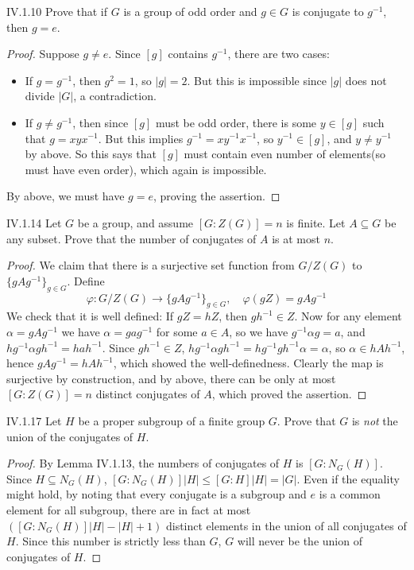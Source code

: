 \begin{problem}{IV.1.10}
Prove that if $G$ is a group of odd order and $g \in G$ is conjugate to $g^{-1}$, then $g = e$.
\end{problem}
\begin{proof}
Suppose $g \neq e$. Since $[g]$ contains $g^{-1}$, there are two cases:
\begin{itemize}
\item If $g = g^{-1}$, then $g^2 = 1$, so $|g| = 2$. But this is impossible since $|g|$ does not divide $|G|$, a contradiction.
\item If $g \neq g^{-1}$, then since $[g]$ must be odd order, there is some $y \in [g]$ such that $g = xyx^{-1}$. But this implies $g^{-1} = xy^{-1}x^{-1}$, so $y^{-1} \in [g]$, and $y \neq y^{-1}$ by above. So this says that $[g]$ must contain even number of elements(so must have even order), which again is impossible. 
\end{itemize} 
By above, we must have $g = e$, proving the assertion.
\end{proof}

\begin{problem}{IV.1.14}
Let $G$ be a group, and assume $[G : Z(G)] = n$ is finite. Let $A \subseteq G$ be any subset. Prove that the number of conjugates of $A$ is at most $n$.
\end{problem}
\begin{proof}
We claim that there is a surjective set function from $G/Z(G)$ to $\{gAg^{-1}\}_{g \in G}$. Define
\[
\varphi : G/Z(G) \to \{gAg^{-1}\}_{g \in G}, \quad \varphi(gZ) = gAg^{-1}
\]
We check that it is well defined: If $gZ = hZ$, then $gh^{-1} \in Z$. Now for any element $\alpha = gAg^{-1}$ we have $\alpha = gag^{-1}$ for some $a \in A$, so we have $g^{-1}\alpha g = a$, and $hg^{-1} \alpha gh^{-1} = hah^{-1}$. Since $gh^{-1} \in Z$, $hg^{-1} \alpha gh^{-1} = hg^{-1} gh^{-1} \alpha = \alpha$, so $\alpha \in hAh^{-1}$, hence $gAg^{-1} = hAh^{-1}$, which showed the well-definedness. Clearly the map is surjective by construction, and by above, there can be only at most $[G:Z(G)] = n$ distinct conjugates of $A$, which proved the assertion.
\end{proof}


\begin{problem}{IV.1.17}
Let $H$ be a proper subgroup of a finite group $G$. Prove that $G$ is \emph{not} the union of the conjugates of $H$.
\end{problem}
\begin{proof}
By Lemma IV.1.13, the numbers of conjugates of $H$ is $[G:N_G(H)]$. Since $H \subseteq N_G(H)$, $[G:N_G(H)]|H| \leq [G:H]|H| = |G|$. Even if the equality might hold, by noting that every conjugate is a subgroup and $e$ is a common element for all subgroup, there are in fact at most $([G:N_G(H)]|H| - |H| + 1)$ distinct elements in the union of all conjugates of $H$. Since this number is strictly less than $G$, $G$ will never be the union of conjugates of $H$.
\end{proof}


